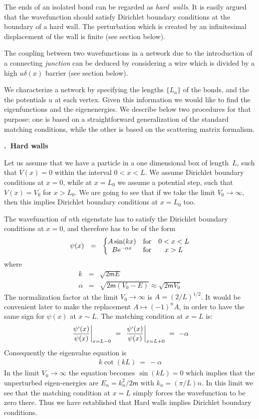 \documentclass[onecolumn,fleqn, 11pt]{revtex4}
\newcommand{\eexp}{\mathrm{e}^}
\newcommand{\mass}{\mathsf{m}}
\newcommand{\amatrix}[1]{\begin{matrix} #1 \end{matrix}}
\newcommand{\beq}{\begin{eqnarray}}
\newcommand{\eeq}{\end{eqnarray}}
\renewcommand{\thesubsection}{\arabic{subsection}}
\renewcommand{\thesubsubsection}{\arabic{subsubsection}}
\newcommand{\sheadC}[1]
{
\addtocounter{subsubsection}{1}
\vspace{5mm}
{\bf \thesubsection.\thesubsubsection \ #1}  
\nopagebreak
\phantomsection
}
\begin{document}
The ends of an isolated bond can be regarded as {\em hard~walls}.
It is easily argued that the wavefunction should satisfy Dirichlet 
boundary conditions at the boundary of a hard wall. 
The perturbation which is created by an infinitesimal 
displacement of the wall is finite (see section below).

The coupling between two wavefunctions in a network due 
to the introduction of a connecting {\em junction} can be deduced 
by considering a wire which is divided by 
a high $u\delta(x)$ barrier (see section below).


We characterize a network by specifying the lengths $\{L_a\}$ 
of the bonds, and the the potentials $u$ at each vertex.   
Given this information we would like to find the eigenfunctions 
and the eigenenergies. 
We describe below two procedures for that purpose: 
one is based on a straightforward generalization 
of the standard matching conditions, 
while the other is based on the scattering matrix formalism.  



\sheadC{Hard walls} 
\label{sWalls}

Let us assume that we have a particle in a one dimensional box 
of length~$L$, such that ${V(x)=0}$ within the interval ${0<x<L}$. 
We assume Dirichlet boundary conditions at ${x=0}$, 
while at ${x=L_0}$ we assume a potential step, 
such that ${V(x)=V_0}$ for ${x>L_0}$. 
We are going to see that if we take the limit ${V_0 \rightarrow \infty}$, 
then this implies Dirichlet boundary conditions at ${x=L_0}$ too.  

The wavefunction of $n$th eigenstate has to 
satisfy the Dirichlet boundary conditions at ${x=0}$, 
and therefore has to be of the form     
\beq
\psi(x) \ \ = \ \ 
\left\{ \amatrix{ 
A\sin(kx)  & \mbox{for} & 0<x<L \cr
B \eexp{-\alpha x} & \mbox{for} &  x>L} 
\right. 
\eeq
where 
\beq
k &=& \sqrt{2\mass E}
\\ \nonumber
\alpha &=& \sqrt{2\mass(V_0-E)} \approx \sqrt{2\mass V_0} 
\eeq
The normalization factor 
at the limit ${V_0 \rightarrow \infty}$ 
is ${A = ({2}/{L})^{1/2} }$. 
It would be convenient later 
to make the replacement ${A \mapsto (-1)^n A}$, 
in order to have the same sign 
for $\psi(x)$ at ${x \sim L}$.   
The matching condition at ${x=L}$ is:
\beq
\left. \frac{\psi`(x)}{\psi(x)} \right|_{x=L-0} 
\,\, =\,\, 
\left. \frac{\psi`(x)}{\psi(x)} \right|_{x=L+0} 
\,\, = \,\, -\alpha 
\eeq
Consequently the eigenvalue equation is 
\beq
k\cot(kL) \ = \ -\alpha 
\eeq
In the limit ${V_0 \rightarrow \infty}$  
the equation becomes ${\sin(kL) = 0}$ 
which implies that the unperturbed 
eigen-energies are ${E_n=k_n^2/2\mass}$
with ${k_n=(\pi/L)n}$. In this limit we 
see that the matching condition 
at ${x=L}$ simply forces the wavefunction 
to be zero there. Thus we have established 
that Hard walls implies Dirichlet boundary 
conditions. 
\end{document}
